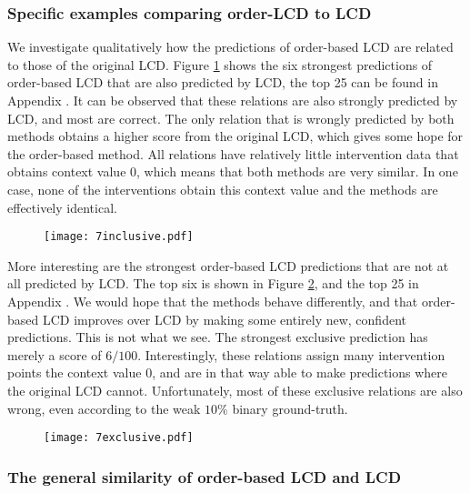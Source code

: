 \subsubsection{Specific examples comparing order-LCD to LCD}

We investigate qualitatively how the predictions of order-based LCD are related to those of the original LCD. Figure \ref{fig:7:exincl} shows the six strongest predictions of order-based LCD that are also predicted by LCD, the top 25 can be found in Appendix . It can be observed that these relations are also strongly predicted by LCD, and most are correct. The only relation that is wrongly predicted by both methods obtains a higher score from the original LCD, which gives some hope for the order-based method. All relations have relatively little intervention data that obtains context value $0$, which means that both methods are very similar. In one case, none of the interventions obtain this context value and the methods are effectively identical. 

\begin{figure}[h]
    \centering
    \texttt{[image: 7inclusive.pdf]}
    \caption{}
    \label{fig:7:exincl}
\end{figure}

More interesting are the strongest order-based LCD predictions that are not at all predicted by LCD. The top six is shown in Figure \ref{fig:7:exexcl}, and the top 25 in Appendix . We would hope that the methods behave differently, and that order-based LCD improves over LCD by making some entirely new, confident predictions. This is not what we see. The strongest exclusive prediction has merely a score of $6/100$. Interestingly, these relations assign many intervention points the context value $0$, and are in that way able to make predictions where the original LCD cannot. Unfortunately, most of these exclusive relations are also wrong, even according to the weak $10\%$ binary ground-truth. 

\begin{figure}[h]
    \centering
    \texttt{[image: 7exclusive.pdf]}
    \caption{}
    \label{fig:7:exexcl}
\end{figure}


\subsubsection{The general similarity of order-based LCD and LCD}

